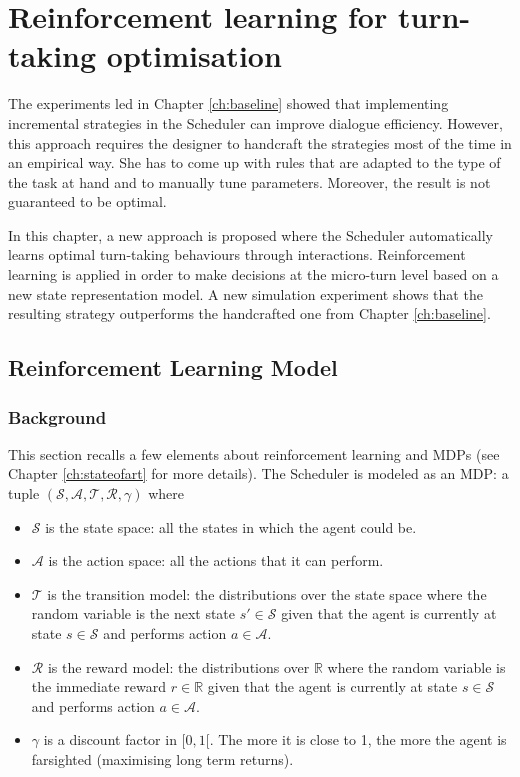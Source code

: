 \chapter{Reinforcement learning for turn-taking optimisation}
\label{ch:rl}

	The experiments led in Chapter \ref{ch:baseline} showed that implementing incremental strategies in the Scheduler can improve dialogue efficiency. However, this approach requires the designer to handcraft the strategies most of the time in an empirical way. She has to come up with rules that are adapted to the type of the task at hand and to manually tune parameters. Moreover, the result is not guaranteed to be optimal.
	
	In this chapter, a new approach is proposed where the Scheduler automatically learns optimal turn-taking behaviours through interactions. Reinforcement learning is applied in order to make decisions at the micro-turn level based on a new state representation model. A new simulation experiment shows that the resulting strategy outperforms the handcrafted one from Chapter \ref{ch:baseline}.

\section{Reinforcement Learning Model}

        \subsection{Background}

             This section recalls a few elements about reinforcement learning and MDPs (see Chapter \ref{ch:stateofart} for more details). The Scheduler is modeled as an MDP: a tuple $(\mathcal{S},\mathcal{A},\mathscr{T},\mathscr{R},\gamma)$ where

             \begin{itemize}
                \item $\mathcal{S}$ is the state space: all the states in which the agent could be.
                \item $\mathcal{A}$ is the action space: all the actions that it can perform.
                \item $\mathscr{T}$ is the transition model: the distributions over the state space where the random variable is the next state $s' \in \mathcal{S}$ given that the agent is currently at state $s \in \mathcal{S}$ and performs action $a \in \mathcal{A}$.
                \item $\mathscr{R}$ is the reward model: the distributions over $\mathbb{R}$ where the random variable is the immediate reward $r \in \mathbb{R}$ given that the agent is currently at state $s \in \mathcal{S}$ and performs action $a \in \mathcal{A}$.
                \item $\gamma$ is a discount factor in $[0,1[$. The more it is close to 1, the more the agent is farsighted (maximising long term returns).
             \end{itemize}

